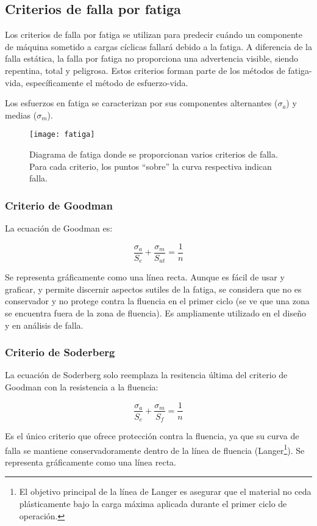 \documentclass[spanish,11pt,a4paper]{article}
\begin{document}
	\subsection{Criterios de falla por fatiga}
	
	Los criterios de falla por fatiga se utilizan para predecir cuándo un componente de máquina sometido a cargas cíclicas fallará debido a la fatiga. A diferencia de la falla estática, la falla por fatiga no proporciona una advertencia visible, siendo repentina, total y peligrosa. Estos criterios forman parte de los métodos de fatiga-vida, específicamente el método de esfuerzo-vida.
	
	
	Los esfuerzos en fatiga se caracterizan por sus componentes alternantes ($\sigma_a$) y medias ($\sigma_m$). 
	
	\begin{figure}[h]
		\centering\caption{Diagrama de fatiga donde se proporcionan varios criterios de falla. Para cada criterio, los puntos ``sobre'' la curva respectiva	indican falla.}
		\texttt{[image: fatiga]}
	\end{figure}
	
	\subsubsection{Criterio de Goodman}
	La ecuación de Goodman es: 
	\begin{tcolorbox}
		$$\dfrac{\sigma_a}{S_e} + \frac{\sigma_m}{S_{ut}} = \frac{1}{n}$$
	\end{tcolorbox}
	Se representa gráficamente como una línea recta. Aunque es fácil de usar y graficar, y permite discernir aspectos sutiles de la fatiga, se considera que no es conservador y no protege contra la fluencia en el primer ciclo (se ve que una zona se encuentra fuera de la zona de fluencia). Es ampliamente utilizado en el diseño y en análisis de falla.
	\subsubsection{Criterio de Soderberg}
	
	La ecuación de Soderberg solo reemplaza la resitencia última del criterio de Goodman con la resistencia a la fluencia: 
	\begin{tcolorbox}
		$$\dfrac{\sigma_a}{S_e} + \frac{\sigma_m}{S_f} = \frac{1}{n}$$
	\end{tcolorbox}
	Es el único criterio que ofrece protección contra la fluencia, ya que su curva de falla se mantiene conservadoramente dentro de la línea de fluencia (Langer\footnote{El objetivo principal de la línea de Langer es asegurar que el material no ceda plásticamente bajo la carga máxima aplicada durante el primer ciclo de operación.}). Se representa gráficamente como una línea recta.
	
\end{document}
